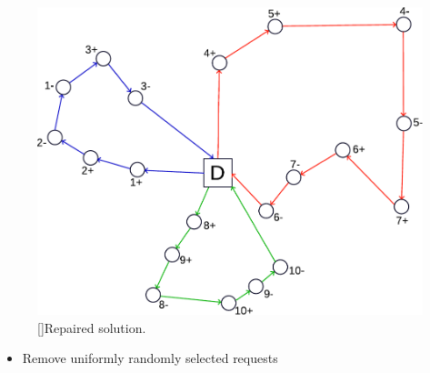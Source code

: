 \documentclass[aspectratio=1610]{beamer}
\let\oldfootnotesize\footnotesize
\renewcommand*{\footnotesize}{\oldfootnotesize\fontsize{6}{4}\selectfont}
\renewcommand{\footnotesize}{\scriptsize}
\begin{document}
\begin{frame}
\begin{minipage}[t]{.3\textwidth}
\begin{figure}
	\centering
	\includegraphics[width=\textwidth]{graphics/lns-repair-solution-new} 
	[]{Repaired solution.}
\end{figure}
\end{minipage}%

\bigskip


\begin{itemize}
	\item Remove uniformly randomly selected requests 
\end{itemize}


\end{frame}
\end{document}
